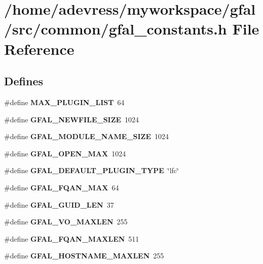 \section{/home/adevress/myworkspace/gfal/src/common/gfal\_\-constants.h File Reference}
\label{gfal__constants_8h}
\subsection*{Defines}
\begin{CompactItemize}
\item 
\#define \textbf{MAX\_\-PLUGIN\_\-LIST}~64\label{gfal__constants_8h_1cae6e1f74c422acdfd33457179e5777}

\item 
\#define \textbf{GFAL\_\-NEWFILE\_\-SIZE}~1024\label{gfal__constants_8h_297519d49026662a60955d6d5e83ffe6}

\item 
\#define \textbf{GFAL\_\-MODULE\_\-NAME\_\-SIZE}~1024\label{gfal__constants_8h_b7ac7a7071265fc62856efb40a9a2f57}

\item 
\#define \textbf{GFAL\_\-OPEN\_\-MAX}~1024\label{gfal__constants_8h_dd3bbae4ae83f55bff1f72071d224f84}

\item 
\#define \textbf{GFAL\_\-DEFAULT\_\-PLUGIN\_\-TYPE}~\char`\"{}lfc\char`\"{}\label{gfal__constants_8h_8ece827a3ec90ab9cbd607bb81ae9f8e}

\item 
\#define \textbf{GFAL\_\-FQAN\_\-MAX}~64\label{gfal__constants_8h_16290fef267c6d4f99d075f869baf36f}

\item 
\#define \textbf{GFAL\_\-GUID\_\-LEN}~37\label{gfal__constants_8h_4e80a5e2ac164a25b36e55d0ce5f5249}

\item 
\#define \textbf{GFAL\_\-VO\_\-MAXLEN}~255\label{gfal__constants_8h_76192327f5c5e09eed57eee3e5386884}

\item 
\#define \textbf{GFAL\_\-FQAN\_\-MAXLEN}~511\label{gfal__constants_8h_6c2fd954a4d022012af906f3889fbe6d}

\item 
\#define \textbf{GFAL\_\-HOSTNAME\_\-MAXLEN}~255\label{gfal__constants_8h_85c450c419c5375c43e92c65a8b0b15c}


\end{CompactItemize}
